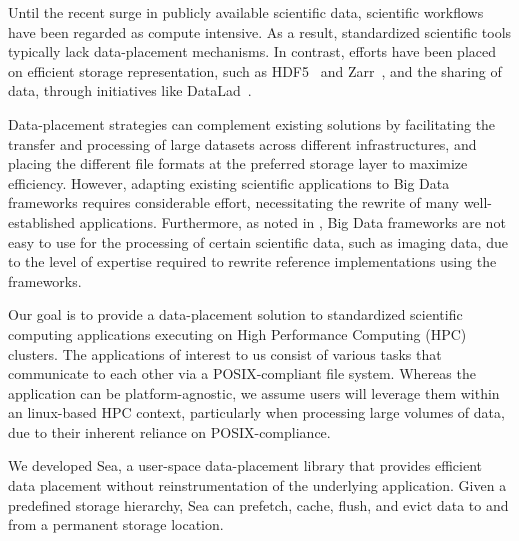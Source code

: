 \documentclass[10pt,journal,compsoc]{IEEEtran}
\begin{document}
Until the recent surge in publicly available scientific data, scientific
workflows have been regarded as compute intensive. As a result, standardized
scientific tools typically lack data-placement mechanisms. In contrast, efforts
have been placed on efficient storage representation, such as HDF5~\cite{hdf5}
and Zarr~\cite{zarr}, and the sharing of data, through initiatives like
DataLad~\cite{wagner2022fairly}.

Data-placement strategies can complement existing solutions by facilitating
the transfer and processing of large datasets across different
infrastructures, and placing the different file formats at the preferred
storage layer to maximize efficiency. However, adapting existing scientific
applications to Big Data frameworks requires considerable effort,
necessitating the rewrite of many well-established applications.
Furthermore, as noted in \cite{mehta2017comparative}, Big Data frameworks
are not easy to use for the processing of certain scientific data, such as
imaging data, due to the level of expertise required to rewrite reference
implementations using the frameworks.






Our goal is to provide a data-placement solution to standardized scientific
computing applications executing on High Performance Computing (HPC) clusters.
The applications of interest to us consist of various tasks that communicate
to each other via a POSIX-compliant file system. Whereas the application can be
platform-agnostic, we assume users will leverage them within an linux-based HPC context,
particularly when processing large volumes of data, due to their inherent
reliance on POSIX-compliance.

We developed Sea, a user-space data-placement library that provides efficient
data placement without reinstrumentation of the underlying application. Given a
predefined storage hierarchy, Sea can prefetch, cache, flush, and evict data to
and from a permanent storage location.
\end{document}
